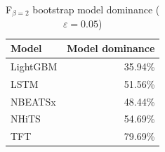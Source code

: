 \begin{table}
\caption{F$_{\beta=2}$ bootstrap model dominance ($\varepsilon=0.05$)}
\begin{tabular}{lr}
\toprule
Model & Model dominance \\
\midrule
LightGBM & 35.94\% \\
LSTM & 51.56\% \\
NBEATSx & 48.44\% \\
NHiTS & 54.69\% \\
TFT & 79.69\% \\
\bottomrule
\end{tabular}
\end{table}
